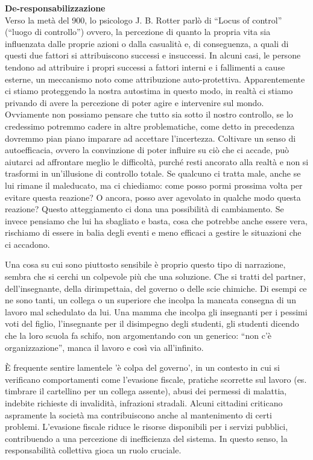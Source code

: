 \documentclass[12pt]{book} %
\begin{document}
\noindent \textbf{\large De-responsabilizzazione} \\
Verso la metà del 900, lo psicologo J. B. Rotter parlò di “Locus of control” (“luogo di controllo”) ovvero, la
percezione di quanto la propria vita sia influenzata dalle proprie azioni o dalla casualità e, di conseguenza, a quali
di questi due fattori si attribuiscono successi e insuccessi. In alcuni casi, le persone tendono ad attribuire i propri successi a fattori interni e i fallimenti a cause esterne, un meccanismo noto come attribuzione auto-protettiva. 
Apparentemente ci stiamo proteggendo la nostra autostima in questo
modo, in realtà ci stiamo privando di avere la percezione di poter agire e intervenire sul mondo. Ovviamente non
possiamo pensare che tutto sia sotto il nostro controllo, se lo credessimo potremmo cadere in altre problematiche, come
detto in precedenza dovremmo pian piano imparare ad accettare l'incertezza. Coltivare un senso di autoefficacia, ovvero la convinzione di poter influire su ciò che ci accade, può aiutarci ad affrontare meglio le difficoltà, purché resti ancorato alla realtà e non si trasformi in un’illusione di controllo totale. Se qualcuno ci tratta male, anche se lui rimane il maleducato, ma
ci chiediamo: come posso pormi prossima volta per evitare questa reazione? O ancora, posso aver agevolato in qualche
modo questa reazione? Questo atteggiamento ci dona una possibilità di cambiamento. Se invece pensiamo che lui ha
sbagliato e basta, cosa che potrebbe anche essere vera, rischiamo di essere in balia degli eventi e meno efficaci a gestire le situazioni che ci accadono.

Una cosa su cui sono piuttosto sensibile è proprio questo tipo di narrazione, sembra che si cerchi un colpevole più che una soluzione. Che si tratti del partner, dell'insegnante, della dirimpettaia,
del governo o delle scie chimiche. Di esempi ce ne sono tanti, un collega o un superiore che incolpa la mancata
consegna di un lavoro mal schedulato da lui. Una mamma che incolpa gli insegnanti per i pessimi voti del figlio,
l'insegnante per il disimpegno degli studenti, gli studenti dicendo che la loro scuola fa schifo,
non argomentando con un generico: “non c'è organizzazione”, manca il lavoro e così via
all'infinito.

È frequente sentire lamentele 'è colpa del governo', in un contesto in cui si verificano comportamenti come l'evasione fiscale, pratiche scorrette sul lavoro (es. timbrare il cartellino per un collega assente), abusi dei permessi di malattia, indebite richieste di invalidità, infrazioni stradali. Alcuni cittadini criticano aspramente la società ma contribuiscono anche al mantenimento di certi problemi.
L’evasione fiscale riduce le risorse disponibili per i servizi pubblici, contribuendo a una percezione di inefficienza del sistema. In questo senso, la responsabilità collettiva gioca un ruolo cruciale.
\end{document}

